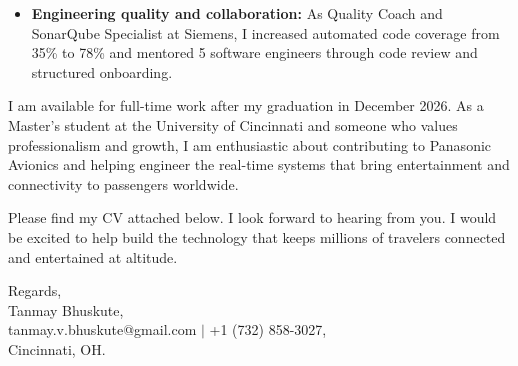 \documentclass[11pt]{letter}
\begin{document}
\begin{letter}{}
\begin{itemize}[leftmargin=*, itemsep=0.45em]
    \item \textbf{Engineering quality and collaboration:} As Quality Coach and SonarQube Specialist at Siemens, I increased automated code coverage from 35\% to 78\% and mentored 5 software engineers through code review and structured onboarding.
\end{itemize}

I am available for full-time work after my graduation in December 2026. As a Master's student at the University of Cincinnati and someone who values professionalism and growth, I am enthusiastic about contributing to Panasonic Avionics and helping engineer the real-time systems that bring entertainment and connectivity to passengers worldwide.

Please find my CV attached below. I look forward to hearing from you. I would be excited to help build the technology that keeps millions of travelers connected and entertained at altitude.

{\setlength{\parskip}{0pt}
Regards,\\
Tanmay Bhuskute,\\
tanmay.v.bhuskute@gmail.com $\mid$ +1 (732) 858-3027,\\
Cincinnati, OH.
}

\end{letter}
\end{document}
